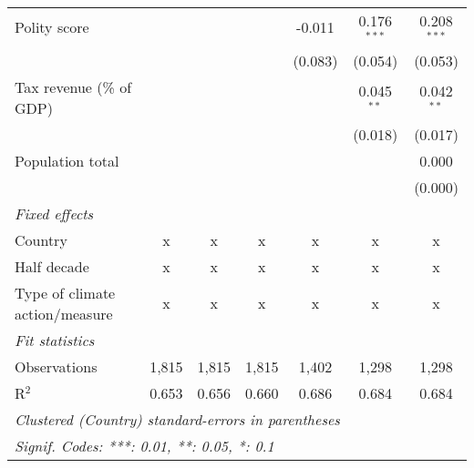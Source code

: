 \begin{tabular}{lcccccc}
   Polity score                                               &         &               &                & -0.011         & 0.176$^{***}$  & 0.208$^{***}$\\   
                                                              &         &               &                & (0.083)        & (0.054)        & (0.053)\\   
   Tax revenue (\% of GDP)                                    &         &               &                &                & 0.045$^{**}$   & 0.042$^{**}$\\   
                                                              &         &               &                &                & (0.018)        & (0.017)\\   
   Population total                                           &         &               &                &                &                & 0.000\\   
                                                              &         &               &                &                &                & (0.000)\\   
   \emph{Fixed effects}\\
   Country                                                    & x       & x             & x              & x              & x              & x\\  
   Half decade                                                & x       & x             & x              & x              & x              & x\\  
   Type of climate action/measure                             & x       & x             & x              & x              & x              & x\\  
   \midrule \emph{Fit statistics}\\
   Observations                                               & 1,815   & 1,815         & 1,815          & 1,402          & 1,298          & 1,298\\  
   R$^2$                                                      & 0.653   & 0.656         & 0.660          & 0.686          & 0.684          & 0.684\\  
   \midrule
   \multicolumn{7}{l}{\emph{Clustered (Country) standard-errors in parentheses}}\\
   \multicolumn{7}{l}{\emph{Signif. Codes: ***: 0.01, **: 0.05, *: 0.1}}\\
\end{tabular}
\par\endgroup


